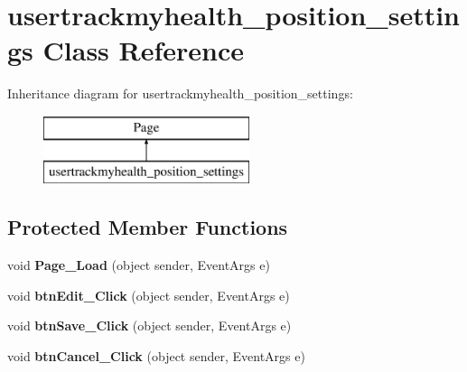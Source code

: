 \hypertarget{classusertrackmyhealth__position__settings}{\section{usertrackmyhealth\-\_\-position\-\_\-settings Class Reference}
\label{classusertrackmyhealth__position__settings}
}
Inheritance diagram for usertrackmyhealth\-\_\-position\-\_\-settings\-:\begin{figure}[H]
\begin{center}
\leavevmode
\includegraphics[height=2.000000cm]{classusertrackmyhealth__position__settings}
\end{center}
\end{figure}
\subsection*{Protected Member Functions}
\begin{DoxyCompactItemize}
\item 
\hypertarget{classusertrackmyhealth__position__settings_afc42a58901bb646276333a2a32bd7581}{void {\bfseries Page\-\_\-\-Load} (object sender, Event\-Args e)}\label{classusertrackmyhealth__position__settings_afc42a58901bb646276333a2a32bd7581}

\item 
\hypertarget{classusertrackmyhealth__position__settings_ae031148ecd680d3f65877ee3371ffb42}{void {\bfseries btn\-Edit\-\_\-\-Click} (object sender, Event\-Args e)}\label{classusertrackmyhealth__position__settings_ae031148ecd680d3f65877ee3371ffb42}

\item 
\hypertarget{classusertrackmyhealth__position__settings_a18411eaa6be4f322371282071b074f89}{void {\bfseries btn\-Save\-\_\-\-Click} (object sender, Event\-Args e)}\label{classusertrackmyhealth__position__settings_a18411eaa6be4f322371282071b074f89}

\item 
\hypertarget{classusertrackmyhealth__position__settings_a85fa5b612bb39dbfa75f421059742862}{void {\bfseries btn\-Cancel\-\_\-\-Click} (object sender, Event\-Args e)}\label{classusertrackmyhealth__position__settings_a85fa5b612bb39dbfa75f421059742862}

\end{DoxyCompactItemize}


